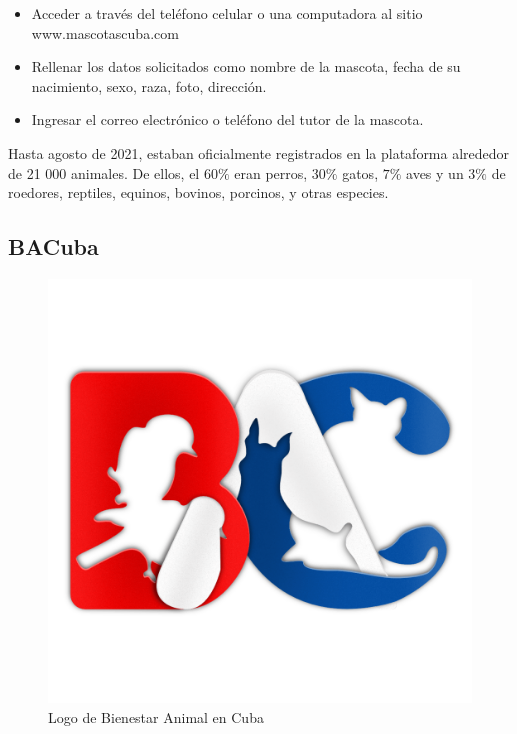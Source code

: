 \begin{itemize}
	\item Acceder a través del teléfono celular o una computadora al sitio www.mascotascuba.com
	\item Rellenar los datos solicitados como nombre de la mascota, fecha de su nacimiento, sexo, raza, foto, dirección.
	\item Ingresar el correo electrónico o teléfono del tutor de la mascota.
\end{itemize}

Hasta agosto de 2021, estaban oficialmente registrados en la plataforma alrededor de 21 000 animales. De ellos, el $60 \%$ eran perros, $30 \%$ gatos, $7 \%$ aves y un $3 \%$ de roedores, reptiles, equinos, bovinos, porcinos, y otras especies.

\subsection{BACuba}\label{chapter:introduction}

\begin{figure}[h!]
	\begin{center}
		\includegraphics[scale=0.09]{Graphics/images/LogodeBienestarAnimalenCuba.png}
		\caption{Logo de Bienestar Animal en Cuba}
		\label{fig:bac}
		
	\end{center}
\end{figure}

